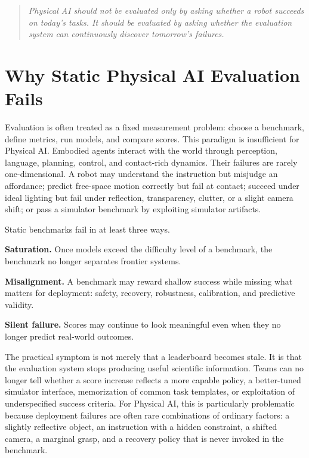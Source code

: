 \documentclass[sigconf,review,anonymous]{acmart}
\begin{document}
\begin{quote}
\emph{Physical AI should not be evaluated only by asking whether a robot succeeds on today's tasks. It should be evaluated by asking whether the evaluation system can continuously discover tomorrow's failures.}
\end{quote}

\section{Why Static Physical AI Evaluation Fails}

Evaluation is often treated as a fixed measurement problem: choose a benchmark, define metrics, run models, and compare scores. This paradigm is insufficient for Physical AI. Embodied agents interact with the world through perception, language, planning, control, and contact-rich dynamics. Their failures are rarely one-dimensional. A robot may understand the instruction but misjudge an affordance; predict free-space motion correctly but fail at contact; succeed under ideal lighting but fail under reflection, transparency, clutter, or a slight camera shift; or pass a simulator benchmark by exploiting simulator artifacts.

Static benchmarks fail in at least three ways.

\textbf{Saturation.} Once models exceed the difficulty level of a benchmark, the benchmark no longer separates frontier systems.

\textbf{Misalignment.} A benchmark may reward shallow success while missing what matters for deployment: safety, recovery, robustness, calibration, and predictive validity.

\textbf{Silent failure.} Scores may continue to look meaningful even when they no longer predict real-world outcomes.

The practical symptom is not merely that a leaderboard becomes stale. It is that the evaluation system stops producing useful scientific information. Teams can no longer tell whether a score increase reflects a more capable policy, a better-tuned simulator interface, memorization of common task templates, or exploitation of underspecified success criteria. For Physical AI, this is particularly problematic because deployment failures are often rare combinations of ordinary factors: a slightly reflective object, an instruction with a hidden constraint, a shifted camera, a marginal grasp, and a recovery policy that is never invoked in the benchmark.
\end{document}
